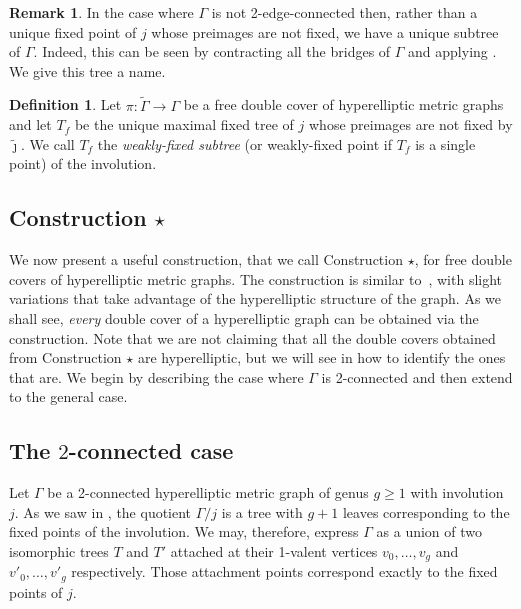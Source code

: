 \documentclass[11pt]{article}
\theoremstyle{definition}
\newtheorem{defi}[theo]{Definition}
\newtheorem{rema}[theo]{Remark}
\numberwithin{equation}{section}
\theoremstyle{definition}
\newcommand{\Ga}{\Gamma}
\newcommand{\tj}{\widetilde{\jmath}}
\newcommand{\wt}[1]{\widetilde{#1}}
\begin{document}
{\begin{rema}\label{rem:fixedpoints}
    In the case where $\Gamma$ is not 2-edge-connected then, rather than  a unique fixed point of $j$  whose preimages are not fixed, we have a unique subtree of $\Gamma$. Indeed, this can be seen by contracting all the bridges of $\Gamma$ and applying . We give this tree a name. 
    \end{rema}


\begin{defi}\label{def:weaklyFixed}
    Let $\pi:\wt\Gamma\to\Gamma$ be a free double cover of hyperelliptic metric graphs and let $T_f$ be the unique maximal fixed tree of $j$ whose preimages are not fixed by $\tj$. We call $T_f$ the \emph{weakly-fixed subtree} (or weakly-fixed point if $T_f$ is a single point) of the involution. 
\end{defi}

\subsection{Construction  \texorpdfstring{$\star$}{*}}
We now present a useful construction, that we call Construction $\star$, for free double covers of  hyperelliptic metric graphs. The construction is similar 
 to~\cite[Construction A]{LZ22}, with slight variations that take advantage of the hyperelliptic structure of the graph. 
As we shall see,  \emph{every} double cover of a hyperelliptic graph can be obtained via the construction.  
Note that we are not claiming that all the double covers obtained from Construction $\star$ are hyperelliptic, but we will see in 
how to identify the ones that are. 
We begin by describing the case where $\Ga$ is 2-connected and then extend to the general case.

\subsection{The \texorpdfstring{$2$}{2}-connected case}\label{sec:2edgeconnectedcase}
Let $\Gamma$ be  a 2-connected hyperelliptic metric graph of genus $g\geq 1$  with involution $j$.
 As we saw in  , the quotient $\Ga/j$ is a tree with $g+1$ leaves corresponding to the fixed points of the involution. We may, therefore, express $\Gamma$ as a union of two isomorphic trees 
 $T$ and $T'$ attached at their 1-valent vertices  $v_0,\dots,v_{g}$ and   $v'_0,\dots,v'_{g}$ respectively. Those attachment points correspond exactly to the fixed points of $j$. 
 
}
\end{document}
